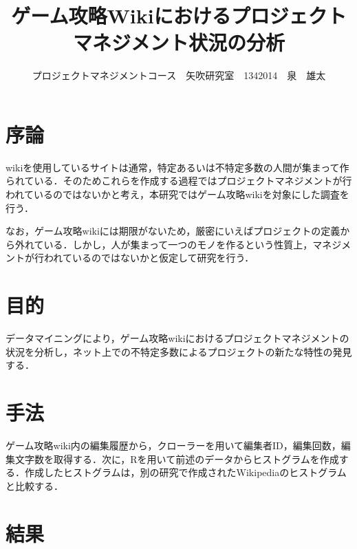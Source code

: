 \documentclass[uplatex,twocolumn,dvipdfmx]{jsarticle}
\title{\vspace{-5mm}\fontsize{14pt}{0pt}\selectfont  ゲーム攻略Wikiにおけるプロジェクトマネジメント状況の分析}
\author{\normalsize プロジェクトマネジメントコース　矢吹研究室　1342014　泉　雄太}
\date{}
\begin{document}
\fontsize{10.5pt}{\baselineskip}\selectfont
\maketitle





\section{序論}

wikiを使用しているサイトは通常，特定あるいは不特定多数の人間が集まって作られている．そのためこれらを作成する過程ではプロジェクトマネジメントが行われているのではないかと考え，本研究ではゲーム攻略wikiを対象にした調査を行う．

なお，ゲーム攻略wikiには期限がないため，厳密にいえばプロジェクトの定義から外れている．しかし，人が集まって一つのモノを作るという性質上，マネジメントが行われているのではないかと仮定して研究を行う．


\section{目的}

データマイニングにより，ゲーム攻略wikiにおけるプロジェクトマネジメントの状況を分析し，ネット上での不特定多数によるプロジェクトの新たな特性の発見する．

\section{手法}

ゲーム攻略wiki内の編集履歴から，クローラーを用いて編集者ID，編集回数，編集文字数を取得する．次に，Rを用いて前述のデータからヒストグラムを作成する．作成したヒストグラムは，別の研究で作成されたWikipediaのヒストグラムと比較する．

\section{結果}
\end{document}
